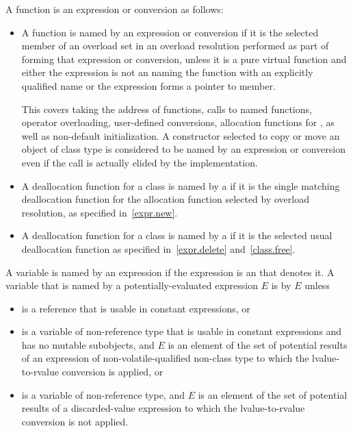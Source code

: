 \pnum
A function is 
an expression or conversion as follows:
\begin{itemize}
\item
  A function is named by an expression or conversion
  if it is the selected member
  of an overload set
  in an overload resolution performed
  as part of forming that expression or conversion,
  unless it is a pure virtual function and either
  the expression is not an  naming the function with
  an explicitly qualified name or
  the expression forms a pointer to member.
  \begin{note}
This covers
  taking the address of functions,
  calls to named functions,
  operator overloading,
  user-defined conversions,
  allocation functions for , as well as
  non-default initialization.
  A constructor selected to copy or move an object of class type
  is considered to be named by an expression or conversion
  even if the call is actually elided by the implementation.
\end{note}
\item
  A deallocation function for a class
  is named by a 
  if it is the single matching deallocation function
  for the allocation function selected by overload resolution,
  as specified in~\ref{expr.new}.
\item
  A deallocation function for a class
  is named by a 
  if it is the selected usual deallocation function
  as specified in~\ref{expr.delete} and~\ref{class.free}.
\end{itemize}

\pnum
\label{term.odr.use}%
A variable is named by an expression
if the expression is an  that denotes it.
A variable  that is named by a
potentially-evaluated expression $E$
is  by $E$ unless
\begin{itemize}
\item
   is a reference that is
  usable in constant expressions, or
\item
   is a variable of non-reference type that is
  usable in constant expressions and has no mutable subobjects, and
  $E$ is an element of the set of potential results of an expression
  of non-volatile-qualified non-class type
  to which the lvalue-to-rvalue conversion is applied, or
\item
   is a variable of non-reference type, and
  $E$ is an element of the set of potential results
  of a discarded-value expression
  to which the lvalue-to-rvalue conversion is not applied.
\end{itemize}

